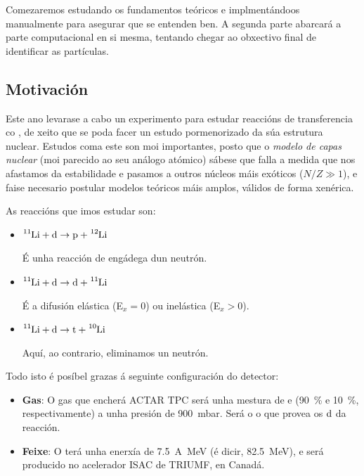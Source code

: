 \documentclass[11pt, a4paper]{article}
\newcommand{\iso}[2]{\ce{^{#1}#2}}
\begin{document}
Comezaremos estudando os fundamentos teóricos e implmentándoos manualmente para asegurar que se entenden ben. A segunda parte abarcará a parte computacional en si mesma, tentando chegar ao obxectivo final de identificar as partículas.

\subsection{Motivación}
Este ano levarase a cabo un experimento para estudar reaccións de transferencia co \iso{11}{Li}, de xeito que se poda facer un estudo pormenorizado da súa estrutura nuclear. Estudos coma este son moi importantes, posto que o \textit{modelo de capas nuclear} (moi parecido ao seu análogo atómico) sábese que falla a medida que nos afastamos da estabilidade e pasamos a outros núcleos máis exóticos ($N / Z \gg 1$), e faise necesario postular modelos teóricos máis amplos, válidos de forma xenérica.

As reaccións que imos estudar son:
\begin{itemize}
    \item $\iso{11}{Li} + \iso{}{d} \rightarrow \iso{}{p} + \iso{12}{Li}$

          É unha reacción de engádega dun neutrón.

    \item $\iso{11}{Li} + \iso{}{d} \rightarrow \iso{}{d} + \iso{11}{Li}$

          É a difusión elástica (E$_{x} = 0$) ou inelástica (E$_x > 0$).

    \item $\iso{11}{Li} + \iso{}{d} \rightarrow \iso{}{t} + \iso{10}{Li}$

          Aquí, ao contrario, eliminamos un neutrón.
\end{itemize}

Todo isto é posíbel grazas á seguinte configuración do detector:
\begin{itemize}
    \item \textbf{Gas}: O gas que encherá ACTAR TPC será unha mestura de  e  (\qty{90}{\percent} e \qty{10}{\percent}, respectivamente) a unha presión de \qty{900}{\milli\bar}. Será o  o que provea os $\iso{}{d}$ da reacción.
    \item \textbf{Feixe}: O \iso{11}{Li} terá unha enerxía de \qty{7.5}{A\MeV} (é dicir, \qty{82.5}{\MeV}), e será producido no acelerador ISAC de TRIUMF, en Canadá.
\end{itemize}
\end{document}
